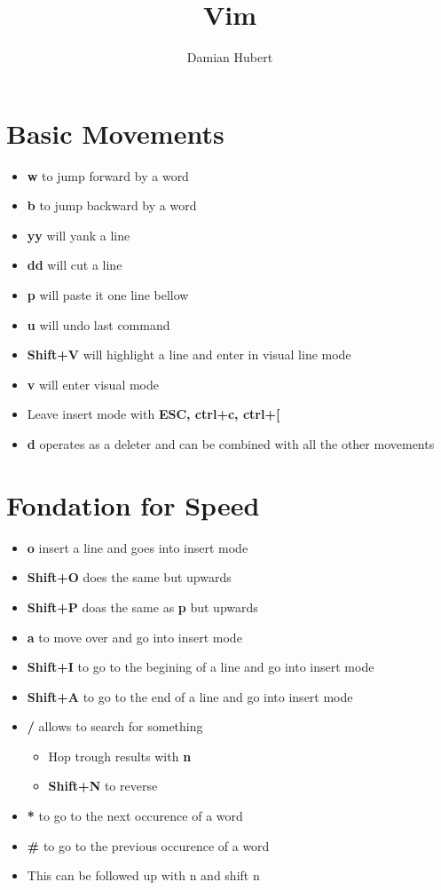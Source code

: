 \documentclass{article}
\author{Damian Hubert}
\title{Vim}
\begin{document}
\maketitle

\section{Basic Movements}

\begin{itemize}
	\item \textbf{w} to jump forward by a word 
	\item \textbf{b} to jump backward by a word 
	\item \textbf{yy} will yank a line 
	\item \textbf{dd} will cut a line
	\item \textbf{p} will paste it one line bellow 
	\item \textbf{u} will undo last command 
	\item \textbf{Shift+V} will highlight a line and enter in visual line mode 
	\item \textbf{v} will enter visual mode 
	\item Leave insert mode with \textbf{ESC, ctrl+c, ctrl+[ } 
	\item \textbf{d} operates as a deleter and can be combined with all the other movements
\end{itemize}

\section{Fondation for Speed}
\begin{itemize}
	\item \textbf{o} insert a line and goes into insert mode 
	\item \textbf{Shift+O} does the same but upwards 
	\item \textbf{Shift+P} doas the same as \textbf{p} but upwards 
	\item \textbf{a} to move over and go into insert mode 
	\item \textbf{Shift+I} to go to the begining of a line and go into insert mode
	\item \textbf{Shift+A} to go to the end of a line and go into insert mode 
	\item \textbf{/} allows to search for something
		\begin{itemize}
			\item Hop trough results with \textbf{n} 
			\item \textbf{Shift+N} to reverse
		\end{itemize}
	\item \textbf{*} to go to the next occurence of a word 
	\item \textbf{\#} to go to the previous occurence of a word 
	\item This can be followed up with n and shift n
\end{itemize}
\end{document}
